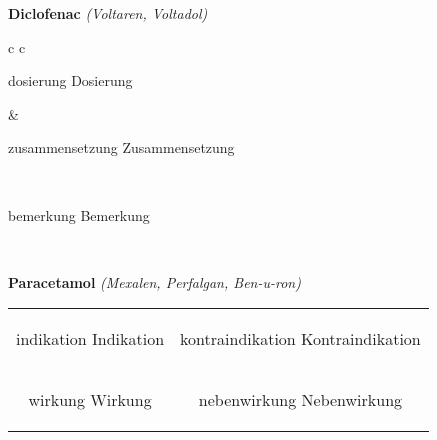\documentclass[12pt]{beamer}
\begin{document}
\begin{frame}{
    \textbf{Diclofenac}
    \textit{(Voltaren, Voltadol)}
}
    \begin{tabular}{c c}
        \begin{beamercolorbox}[wd=\boxwidth\textwidth,ht=\boxheight\textheight,sep=1em]{dosierung}
        Dosierung
        \end{beamercolorbox} & 
        \begin{beamercolorbox}[wd=\boxwidth\textwidth,ht=\boxheight\textheight,sep=1em]{zusammensetzung}
        Zusammensetzung
        \end{beamercolorbox} \\
        \begin{beamercolorbox}[wd=\textwidth,ht=\boxheight\textheight,sep=1em]{bemerkung}
        Bemerkung
        \end{beamercolorbox} \\
    \end{tabular}
\end{frame}

\begin{frame}{
    \textbf{Paracetamol}
    \textit{(Mexalen, Perfalgan, Ben-u-ron)}
}
    \begin{tabular}{c c}
        \begin{beamercolorbox}[wd=\boxwidth\textwidth,ht=\boxheight\textheight,sep=1em]{indikation}
        Indikation
        \end{beamercolorbox} & 
        \begin{beamercolorbox}[wd=\boxwidth\textwidth,ht=\boxheight\textheight,sep=1em]{kontraindikation}
        Kontraindikation 
        \end{beamercolorbox} \\
        \begin{beamercolorbox}[wd=\boxwidth\textwidth,ht=\boxheight\textheight,sep=1em]{wirkung}
        Wirkung
        \end{beamercolorbox} & 
        \begin{beamercolorbox}[wd=\boxwidth\textwidth,ht=\boxheight\textheight,sep=1em]{nebenwirkung}
        Nebenwirkung
        \end{beamercolorbox} \\
    \end{tabular}
\end{frame}
\end{document}
